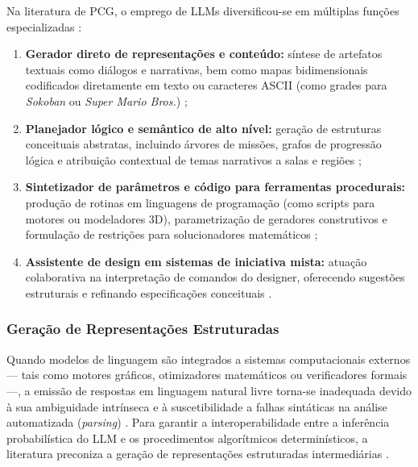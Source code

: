 Na literatura de PCG, o emprego de LLMs diversificou-se em múltiplas funções especializadas \cite{Gallotta_2024, maleki2024procedural}:
\begin{enumerate}
    \item \textbf{Gerador direto de representações e conteúdo:} síntese de artefatos textuais como diálogos e narrativas, bem como mapas bidimensionais codificados diretamente em texto ou caracteres ASCII (como grades para \textit{Sokoban} ou \textit{Super Mario Bros.}) \cite{todd2023level, nasir2024word2worldgeneratingstoriesworlds};
    \item \textbf{Planejador lógico e semântico de alto nível:} geração de estruturas conceituais abstratas, incluindo árvores de missões, grafos de progressão lógica e atribuição contextual de temas narrativos a salas e regiões \cite{Gallotta_2024, xu2025databasedrivenframework3dlevel, wang2026designerlyloop};
    \item \textbf{Sintetizador de parâmetros e código para ferramentas procedurais:} produção de rotinas em linguagens de programação (como scripts para motores ou modeladores 3D), parametrização de geradores construtivos e formulação de restrições para solucionadores matemáticos \cite{hu2024scenecraft, tang2025unrealllm, xu2025constraint, yang2026codeasroomgenerating3drooms};
    \item \textbf{Assistente de design em sistemas de iniciativa mista:} atuação colaborativa na interpretação de comandos do designer, oferecendo sugestões estruturais e refinando especificações conceituais \cite{Gallotta_2024, bandeali2026generative, wang2026designerlyloop}.
\end{enumerate}

\subsubsection{Geração de Representações Estruturadas}
\label{sec:representacoes_estruturadas}

Quando modelos de linguagem são integrados a sistemas computacionais externos --- tais como motores gráficos, otimizadores matemáticos ou verificadores formais ---, a emissão de respostas em linguagem natural livre torna-se inadequada devido à sua ambiguidade intrínseca e à suscetibilidade a falhas sintáticas na análise automatizada (\textit{parsing}) \cite{xu2025constraint, regmi2025system}. Para garantir a interoperabilidade entre a inferência probabilística do LLM e os procedimentos algorítmicos determinísticos, a literatura preconiza a geração de representações estruturadas intermediárias \cite{hu2024scenecraft, tang2025unrealllm, xu2025constraint, chen2025narrative, wang2026designerlyloop}.

